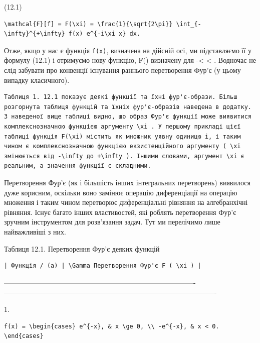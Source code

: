 \documentclass[
  ukrainian,
]{article}
\begin{document}
(12.1)

\begin{verbatim}
\mathcal{F}[f] = F(\xi) = \frac{1}{\sqrt{2\pi}} \int_{-\infty}^{+\infty} f(x) e^{-i\xi x} dx.
\end{verbatim}

Отже, якщо у нас є функція \texttt{f(x)}, визначена на дійсній осі, ми
підставляємо її у формулу (12.1) і отримуємо нову функцію, F(\xi)
визначену для -\infty \textless{} \xi \textless{} \infty . Водночас не
слід забувати про конвенції існування раннього перетворення Фур'є (у
цьому випадку класичного).

\begin{verbatim}
Таблиця 1. 12.1 показує деякі функції та їхні фур'є-образи. Більш розгорнута таблиця функцій та їхніх фур'є-образів наведена в додатку. З наведеної вище таблиці видно, що образ Фур'є функції може виявитися комплекснозначною функцією аргументу \xi . У першому прикладі цієї таблиці функція F(\xi) містить як множник уявну одиницю i, і таким чином є комплекснозначною функцією екзистенційного аргументу ( \xi змінюється від -\infty до +\infty ). Іншими словами, аргумент \xi є реальним, а значення функції є складними.
\end{verbatim}

Перетворення Фур'є (як і більшість інших інтегральних перетворень)
виявилося дуже корисним, оскільки воно замінює операцію диференціації на
операцію множення і таким чином перетворює диференціальні рівняння на
алгебранхічні рівняння. Існує багато інших властивостей, які роблять
перетворення Фур'є зручним інструментом для розв'язання задач. Тут ми
перелічимо лише найважливіші з них.

Таблиця 12.1. Перетворення Фур'є деяких функцій

\begin{verbatim}
| Функція / (a) | \Gamma Перетворення Фур'є F ( \xi ) |
\end{verbatim}

\textbar----------------------------------------------------------------------------------\textbar-------------------------------------------------------------------------------------------\textbar{}

1.

\begin{verbatim}
f(x) = \begin{cases} e^{-x}, & x \ge 0, \\ -e^{-x}, & x < 0. \end{cases}
\end{verbatim}
\end{document}
